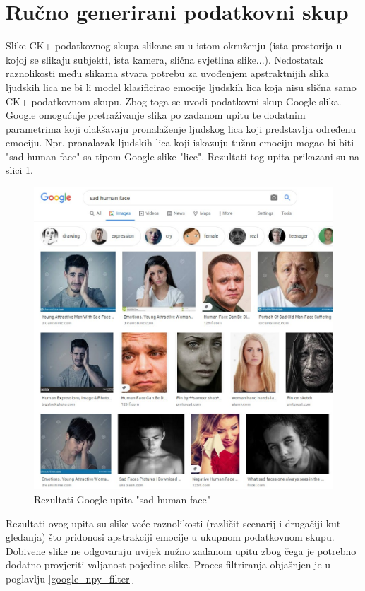 \documentclass[times, utf8, zavrsni,numeric,pstricks]{fer}
\begin{document}
\section{Ručno generirani podatkovni skup}
Slike CK+ podatkovnog skupa slikane su u istom okruženju (ista prostorija u kojoj se slikaju subjekti, ista kamera, slična svjetlina slike...). Nedostatak raznolikosti među slikama stvara potrebu za uvođenjem apstraktnijih slika ljudskih lica ne bi li model klasificirao emocije ljudskih lica koja nisu slična samo CK+ podatkovnom skupu. Zbog toga se uvodi podatkovni skup Google slika. Google omogućuje pretraživanje slika po zadanom upitu te dodatnim parametrima koji olakšavaju pronalaženje ljudskog lica koji predstavlja određenu emociju. Npr. pronalazak ljudskih lica koji iskazuju tužnu emociju mogao bi biti "sad human face" sa tipom Google slike "lice". Rezultati tog upita prikazani su na slici \ref{pic:google_search_sad}.

\begin{figure}[H]
	\centering
	\includegraphics[width=\linewidth, height=0.3\paperheight, keepaspectratio]{2020-06-08-22-16-22.jpeg}
	\caption{Rezultati Google upita "sad human face"}
	\label{pic:google_search_sad}
\end{figure}

Rezultati ovog upita su slike veće raznolikosti (različit scenarij i drugačiji kut gledanja) što pridonosi apstrakciji emocije u ukupnom podatkovnom skupu. Dobivene slike ne odgovaraju uvijek nužno zadanom upitu zbog čega je potrebno dodatno provjeriti valjanost pojedine slike. Proces filtriranja objašnjen je u poglavlju \ref{google_npy_filter}
\end{document}
